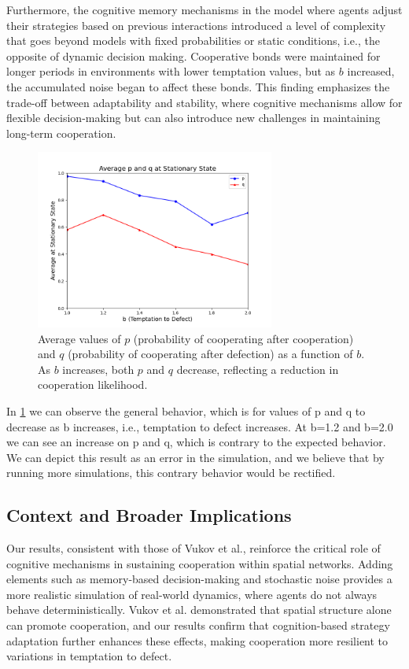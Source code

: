 \documentclass[runningheads]{llncs}
\begin{document}
Furthermore, the cognitive memory mechanisms in the model where agents
adjust their strategies based on
previous interactions introduced a level of complexity that goes beyond models with
fixed probabilities or static conditions, i.e., the opposite of dynamic decision making.
Cooperative bonds were maintained for longer periods in environments with lower
temptation values, but as \( b \) increased, the accumulated noise began to affect
these bonds. This finding emphasizes the trade-off between adaptability and stability,
where cognitive mechanisms allow for flexible decision-making but can also
introduce new challenges in maintaining long-term cooperation.

\begin{figure}[H]
    \centering
    \includegraphics[width=0.7\textwidth]{p_q_vs_b.png}
    \caption{Average values of \( p \) (probability of cooperating after cooperation)
    and \( q \) (probability of cooperating after defection) as a function of \( b \).
    As \( b \) increases, both \( p \) and \( q \) decrease, reflecting a
    reduction in cooperation likelihood.}
    \label{fig:p_q_vs_b}
\end{figure}

In \ref{fig:p_q_vs_b} we can observe the general behavior, which is for values of
p and q to decrease as b increases, i.e., temptation to defect increases. At b=1.2
and b=2.0 we can see an increase on p and q, which is contrary to the expected behavior.
We can depict this result as an error in the simulation, and we believe that
by running more simulations, this contrary behavior would be rectified.



\subsection{Context and Broader Implications}
Our results, consistent with those of Vukov et al., reinforce the critical role
of cognitive mechanisms in sustaining cooperation within spatial networks.
Adding elements such as memory-based decision-making and stochastic noise
provides a more realistic simulation of real-world dynamics, where agents do
not always behave deterministically. Vukov et al. \cite{vukov} demonstrated that
spatial structure alone can promote cooperation, and our results confirm
that cognition-based strategy adaptation further enhances these effects, making
cooperation more resilient to variations in temptation to defect.
\end{document}
